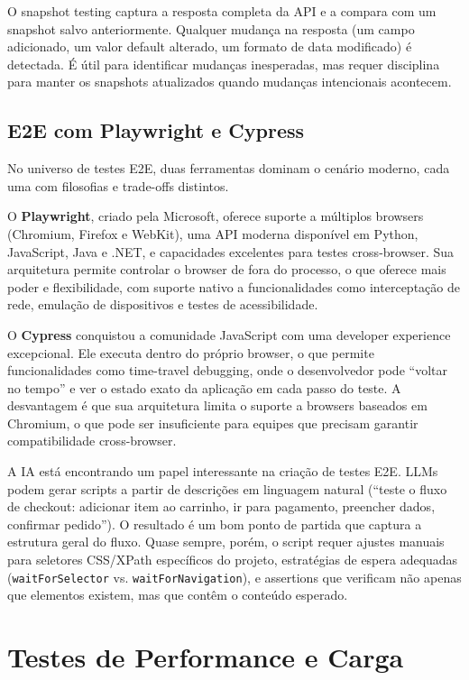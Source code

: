 O snapshot testing captura a resposta completa da API e a compara com um
snapshot salvo anteriormente. Qualquer mudança na resposta (um campo
adicionado, um valor default alterado, um formato de data modificado) é
detectada. É útil para identificar mudanças inesperadas, mas requer disciplina
para manter os snapshots atualizados quando mudanças intencionais acontecem.

\subsection{E2E com Playwright e Cypress}

No universo de testes E2E, duas ferramentas dominam o cenário moderno, cada uma
com filosofias e trade-offs distintos.

O \textbf{Playwright}, criado pela Microsoft, oferece suporte a múltiplos
browsers (Chromium, Firefox e WebKit), uma API moderna disponível em Python,
JavaScript, Java e .NET, e capacidades excelentes para testes cross-browser.
Sua arquitetura permite controlar o browser de fora do processo, o que oferece
mais poder e flexibilidade, com suporte nativo a funcionalidades como
interceptação de rede, emulação de dispositivos e testes de acessibilidade.

O \textbf{Cypress} conquistou a comunidade JavaScript com uma developer
experience excepcional. Ele executa dentro do próprio browser, o que permite
funcionalidades como time-travel debugging, onde o desenvolvedor pode
``voltar no tempo'' e ver o estado exato da aplicação em cada passo do teste.
A desvantagem é que sua arquitetura limita o suporte a browsers baseados em
Chromium, o que pode ser insuficiente para equipes que precisam garantir
compatibilidade cross-browser.

A IA está encontrando um papel interessante na criação de testes E2E. LLMs
podem gerar scripts a partir de descrições em linguagem natural (``teste o
fluxo de checkout: adicionar item ao carrinho, ir para pagamento, preencher
dados, confirmar pedido''). O resultado é um bom ponto de partida que captura a
estrutura geral do fluxo. Quase sempre, porém, o script requer ajustes manuais para
seletores CSS/XPath específicos do projeto, estratégias de espera adequadas
(\texttt{waitForSelector} vs. \texttt{waitForNavigation}), e assertions que
verificam não apenas que elementos existem, mas que contêm o conteúdo esperado.

\section{Testes de Performance e Carga}


